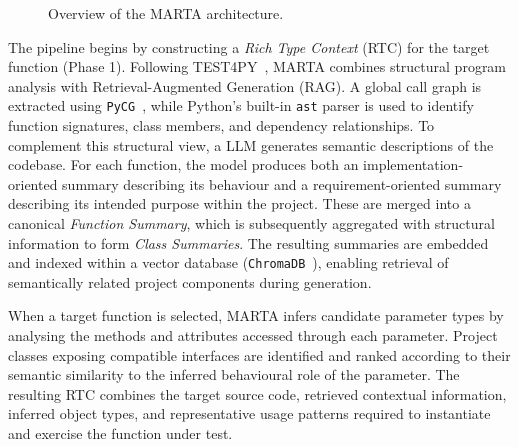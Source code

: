 \documentclass{llncs}
\begin{document}
\begin{figure}[htbp]
{
    }
    \caption{Overview of the MARTA architecture.}
    \label{fig:architecture}
\end{figure}

The pipeline begins by constructing a \textit{Rich Type Context} (RTC) for the target function (Phase 1). Following TEST4PY~\cite{test4py2025}, MARTA combines structural program analysis with Retrieval-Augmented Generation (RAG). A global call graph is extracted using \texttt{PyCG}~\cite{salis2021pycg}, while Python's built-in \texttt{ast} parser is used to identify function signatures, class members, and dependency relationships. To complement this structural view, a LLM generates semantic descriptions of the codebase. For each function, the model produces both an implementation-oriented summary describing its behaviour and a requirement-oriented summary describing its intended purpose within the project. These are merged into a canonical \textit{Function Summary}, which is subsequently aggregated with structural information to form \textit{Class Summaries}. The resulting summaries are embedded and indexed within a vector database (\texttt{ChromaDB}~\cite{chromadb}), enabling retrieval of semantically related project components during generation.

When a target function is selected, MARTA infers candidate parameter types by analysing the methods and attributes accessed through each parameter. Project classes exposing compatible interfaces are identified and ranked according to their semantic similarity to the inferred behavioural role of the parameter. The resulting RTC combines the target source code, retrieved contextual information, inferred object types, and representative usage patterns required to instantiate and exercise the function under test.
\end{document}
